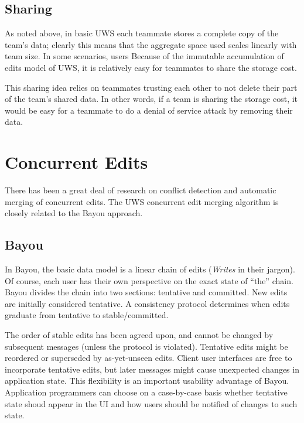 \documentclass{article}
\begin{document}
\subsection{Sharing}

As noted above, in basic UWS each teammate stores a complete copy of the team's data; clearly this means that the aggregate space used scales linearly with team size.
In some scenarios, users 
Because of the immutable accumulation of edits model of UWS, it is relatively easy for teammates to share the storage cost.

This sharing idea relies on teammates trusting each other to not delete their part of the team's shared data.
In other words, if a team is sharing the storage cost, it would be easy for a teammate to do a denial of service attack by removing their data.



\section{Concurrent Edits}

There has been a great deal of research on conflict detection and automatic merging of concurrent edits.
The UWS concurrent edit merging algorithm is closely related to the Bayou approach.

\subsection{Bayou}

In Bayou, the basic data model is a linear chain of edits (\emph{Writes} in their jargon).
Of course, each user has their own perspective on the exact state of ``the'' chain.
Bayou divides the chain into two sections: tentative and committed.
New edits are initially considered tentative.
A consistency protocol determines when edits graduate from tentative to stable{\slash}committed.

The order of stable edits has been agreed upon, and cannot be changed by subsequent messages (unless the protocol is violated).
Tentative edits might be reordered or superseded by as-yet-unseen edits.
Client user interfaces are free to incorporate tentative edits, but later messages might cause unexpected changes in application state.
This flexibility is an important usability advantage of Bayou.
Application programmers can choose on a case-by-case basis whether tentative state shoud appear in the UI and how users should be notified of changes to such state.
\end{document}

